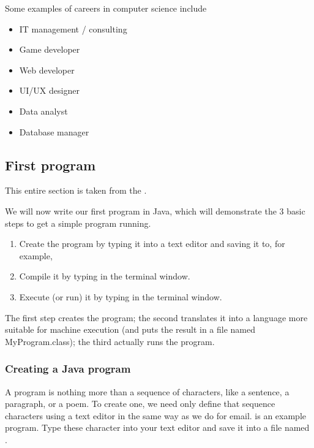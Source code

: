 \documentclass[letterpaper,10pt,english,openany,oneside]{sphinxmanual}
\begin{document}
Some examples of careers in computer science include
\begin{itemize}
\item {} 
IT management / consulting

\item {} 
Game developer

\item {} 
Web developer

\item {} 
UI/UX designer

\item {} 
Data analyst

\item {} 
Database manager

\end{itemize}


\subsection{First program}
\label{\detokenize{introduction:first-program}}
This entire section is taken from the .

We will now write our first program in Java, which will demonstrate the 3 basic steps to get a simple program running.
\begin{enumerate}
\def\theenumi{\arabic{enumi}}
\def\labelenumi{\theenumi .}
\makeatletter\def\p@enumii{\p@enumi \theenumi .}\makeatother
\item {} 
Create the program by typing it into a text editor and saving it to, for example, 

\item {} 
Compile it by typing  in the terminal window.

\item {} 
Execute (or run) it by typing  in the terminal window.

\end{enumerate}

The first step creates the program; the second translates it into a language more suitable for machine execution (and puts the result in a file named MyProgram.class); the third actually runs the program.


\subsubsection{Creating a Java program}
\label{\detokenize{introduction:creating-a-java-program}}
A program is nothing more than a sequence of characters, like a sentence, a paragraph, or a poem. To create one, we need only define that sequence characters using a text editor in the same way as we do for email.  is an example program. Type these character into your text editor and save it into a file named .
\end{document}
